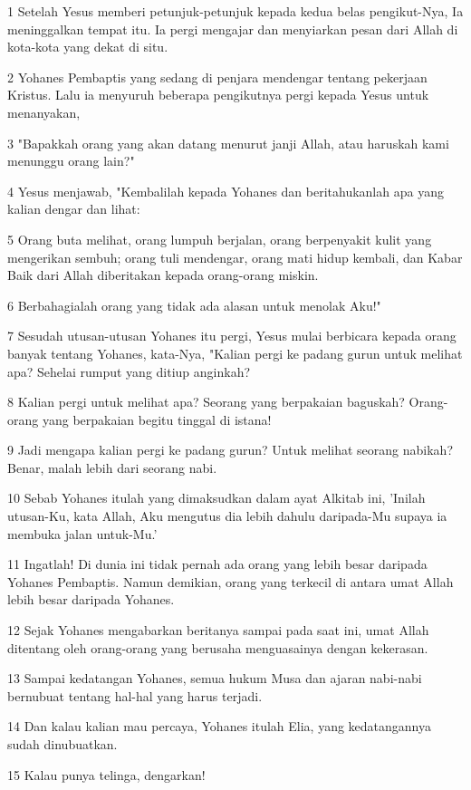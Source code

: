 \par 1 Setelah Yesus memberi petunjuk-petunjuk kepada kedua belas pengikut-Nya, Ia meninggalkan tempat itu. Ia pergi mengajar dan menyiarkan pesan dari Allah di kota-kota yang dekat di situ.
\par 2 Yohanes Pembaptis yang sedang di penjara mendengar tentang pekerjaan Kristus. Lalu ia menyuruh beberapa pengikutnya pergi kepada Yesus untuk menanyakan,
\par 3 "Bapakkah orang yang akan datang menurut janji Allah, atau haruskah kami menunggu orang lain?"
\par 4 Yesus menjawab, "Kembalilah kepada Yohanes dan beritahukanlah apa yang kalian dengar dan lihat:
\par 5 Orang buta melihat, orang lumpuh berjalan, orang berpenyakit kulit yang mengerikan sembuh; orang tuli mendengar, orang mati hidup kembali, dan Kabar Baik dari Allah diberitakan kepada orang-orang miskin.
\par 6 Berbahagialah orang yang tidak ada alasan untuk menolak Aku!"
\par 7 Sesudah utusan-utusan Yohanes itu pergi, Yesus mulai berbicara kepada orang banyak tentang Yohanes, kata-Nya, "Kalian pergi ke padang gurun untuk melihat apa? Sehelai rumput yang ditiup anginkah?
\par 8 Kalian pergi untuk melihat apa? Seorang yang berpakaian baguskah? Orang-orang yang berpakaian begitu tinggal di istana!
\par 9 Jadi mengapa kalian pergi ke padang gurun? Untuk melihat seorang nabikah? Benar, malah lebih dari seorang nabi.
\par 10 Sebab Yohanes itulah yang dimaksudkan dalam ayat Alkitab ini, 'Inilah utusan-Ku, kata Allah, Aku mengutus dia lebih dahulu daripada-Mu supaya ia membuka jalan untuk-Mu.'
\par 11 Ingatlah! Di dunia ini tidak pernah ada orang yang lebih besar daripada Yohanes Pembaptis. Namun demikian, orang yang terkecil di antara umat Allah lebih besar daripada Yohanes.
\par 12 Sejak Yohanes mengabarkan beritanya sampai pada saat ini, umat Allah ditentang oleh orang-orang yang berusaha menguasainya dengan kekerasan.
\par 13 Sampai kedatangan Yohanes, semua hukum Musa dan ajaran nabi-nabi bernubuat tentang hal-hal yang harus terjadi.
\par 14 Dan kalau kalian mau percaya, Yohanes itulah Elia, yang kedatangannya sudah dinubuatkan.
\par 15 Kalau punya telinga, dengarkan!
